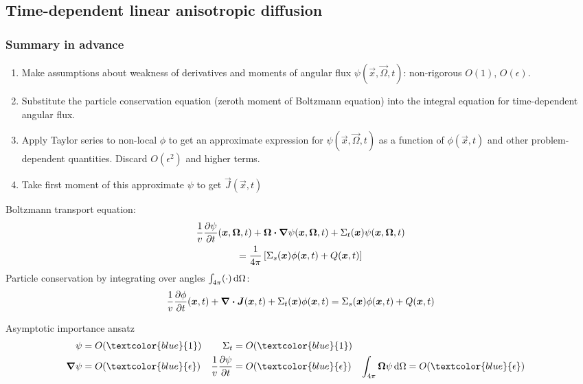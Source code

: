 \documentclass{beamer}
\newcommand{\epsiloncolor}[1]{\textcolor{blue}{#1}}
\begin{document}
\subsection{Time-dependent linear anisotropic diffusion}
\begin{frame}
  \frametitle{Summary in advance}
  \begin{enumerate}
    \item Make assumptions about weakness of derivatives and moments of angular
      flux $\psi(\vec{x}, \vec{\Omega}, t)$: non-rigorous $O(1)$, $O(\epsilon)$.
    \item Substitute the particle conservation equation (zeroth moment of
      Boltzmann equation) into the integral equation for time-dependent angular
      flux.
    \item Apply Taylor series to non-local $\phi$ to get an approximate
      expression for $\psi(\vec{x}, \vec{\Omega}, t)$ as a function of
      $\phi(\vec{x}, t)$ and other problem-dependent quantities.
      Discard $O(\epsilon^2)$ and higher terms.
    \item Take first moment of this approximate $\psi$ to get
      $\vec{J}(\vec{x}, t)$
  \end{enumerate}
\end{frame}
\begin{frame}
  Boltzmann transport equation:
  \begin{multline} \label{eq:shortBoltzmannTd}
    \frac1v \frac{\partial \psi}{\partial t}(\bm{x}, \bm{\Omega}, t) + \bm{\Omega} \bm{\cdot} \bm{\nabla}
    \psi(\bm{x}, \bm{\Omega}, t) + \Sigma_t (\bm{x}) \psi(\bm{x},
    \bm{\Omega}, t) \\ =
    \frac{1}{4\pi} \left[ \Sigma_s (\bm{x}) \phi(\bm{x}, t) + Q(\bm{x}, t) \right]
  \end{multline}
  Particle conservation by integrating over angles $\int_{4\pi} (\cdot) \mathop{}\!\mathrm{d}
  \Omega$:
  \begin{equation} \label{eq:shortConservationTd}
    \frac1v\frac{\partial \phi}{\partial t}(\bm{x}, t) + \bm{\nabla} \bm{\cdot} \bm{J}(\bm{x}, t)
    + \Sigma_t (\bm{x}) \phi(\bm{x}, t) =
   \Sigma_s (\bm{x}) \phi(\bm{x}, t) + Q(\bm{x}, t)
  \end{equation}

  \begin{block}{Asymptotic importance ansatz}
    \begin{align*}
      \psi &= O(\epsiloncolor{1}) & \Sigma_t &= O(\epsiloncolor{1}) \\
      \del \psi &= O(\epsiloncolor{\epsilon}) &
      \frac1v\pder{\psi}{t} &= O(\epsiloncolor{\epsilon}) &
      \int_{4\pi} \vec{\Omega} \psi\ud \Omega &= O(\epsiloncolor{\epsilon})
    \end{align*}
  \end{block}
\end{frame}
\end{document}

